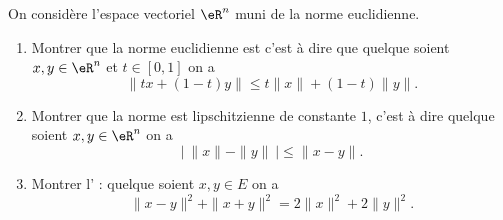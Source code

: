 \begin{exercice}[\minsyndical]\label{exoEspVectoNorme0001}

On considère l'espace vectoriel $\eR^n$ muni de la norme euclidienne.
\begin{enumerate}
	\item
		Montrer que la norme euclidienne est  c'est à dire que quelque soient  $ x,y  \in \eR^n $ et $ t \in [0,1]$ on a 
		 \begin{equation}
	 		\|tx + (1-t)y\| \le t\|x\| + (1-t)\|y\|.
		 \end{equation}
	 
	\item
		 Montrer que la norme est lipschitzienne de constante $1$,  c'est à dire
	        quelque soient  $ x,y  \in \eR^n$ on a 
		\begin{equation}
		         \left| \ \|x\| - \|y\| \ \right| \le \|x-y\|. 
		\end{equation}
 \item
	 Montrer l' :
        quelque soient  $ x,y  \in E $ on a 
	\begin{equation}
	        \|x-y\|^2 + \|x+y\|^2 = 2\|x\|^2 + 2\|y\|^2 .
	\end{equation}
		
\end{enumerate}


\end{exercice}
